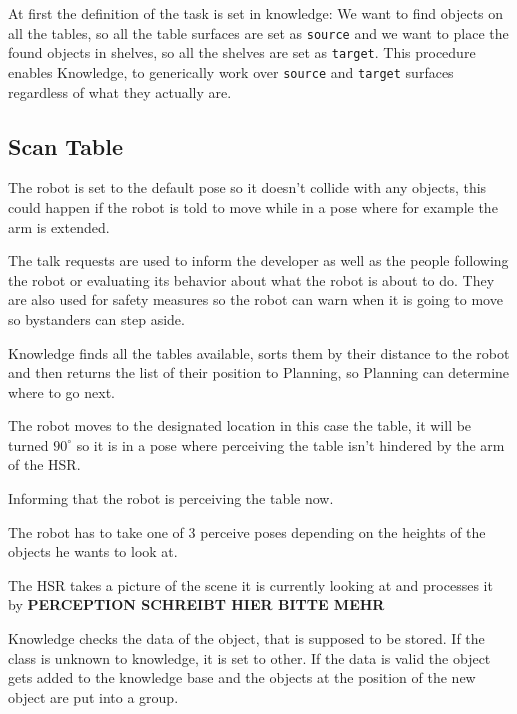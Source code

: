 \documentclass[main.tex]{subfiles}
\begin{document}
	At first the definition of the task is set in knowledge: We want to find objects on all the tables, so all the table surfaces are set as \texttt{source} and we want to place the found objects in shelves, so all the shelves are set as \texttt{target}. This procedure enables Knowledge, to generically work over \texttt{source} and \texttt{target} surfaces regardless of what they actually are.
	
	\subsection{Scan Table}
	
	The robot is set to the default pose so it doesn't collide with any objects, this could happen if the robot is told to move while in a pose where for example the arm is extended.
	
	
	The talk requests are used to inform the developer as well as the people following the robot or evaluating its behavior about what the robot is about to do. They are also used for safety measures so the robot can warn when it is going to move so bystanders can step aside. 
	
	Knowledge finds all the tables available, sorts them by their distance to the robot and then returns the list of their position to Planning, so Planning can determine where to go next.
	
	
	The robot moves to the designated location in this case the table, it will be turned $90^\circ$ so it is in a pose where perceiving the table isn't hindered by the arm of the HSR. 
	
	Informing that the robot is perceiving the table now.
	
	The robot has to take one of 3 perceive poses depending on the heights of the objects he wants to look at.
	
	The HSR takes a picture of the scene it is currently looking at and processes it by \textbf{PERCEPTION SCHREIBT HIER BITTE MEHR}
	
	Knowledge checks the data of the object, that is supposed to be stored. If the class is unknown to knowledge, it is set to other. If the data is valid the object gets added to the knowledge base and the objects at the position of the new object are put into a group.
	
\end{document}
